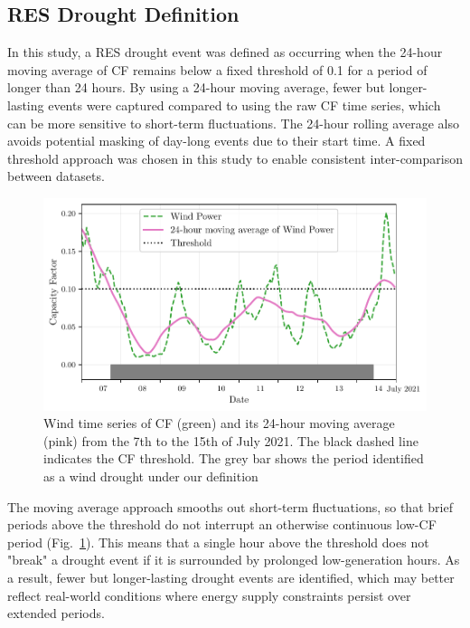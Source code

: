 \documentclass[preprint, 12pt]{elsarticle}
\begin{document}
\subsection{RES Drought Definition}
\label{sec:res_drought}

In this study, a RES drought event was defined as occurring when the 24-hour moving average of CF remains below a fixed threshold of 0.1 for a period of longer than 24 hours. By using a 24-hour moving average, fewer but longer-lasting events were captured compared to using the raw CF time series, which can be more sensitive to short-term fluctuations. The 24-hour rolling average also avoids potential masking of day-long events due to their start time. A fixed threshold approach was chosen in this study to enable consistent inter-comparison between datasets.

\begin{figure}[ht!]
	\centering
	\includegraphics[width=\textwidth]{droughts_methodology.pdf}
	\caption{Wind time series of CF (green) and its 24-hour moving average (pink) from the 7th to the 15th of July 2021. The black dashed line indicates the CF threshold. The grey bar shows the period identified as a wind drought under our definition}
	\label{fig:find_res_droughts}
\end{figure}

The moving average approach smooths out short-term fluctuations, so that brief periods above the threshold do not interrupt an otherwise continuous low-CF period (Fig.~\ref{fig:find_res_droughts}). This means that a single hour above the threshold does not "break" a drought event if it is surrounded by prolonged low-generation hours. As a result, fewer but longer-lasting drought events are identified, which may better reflect real-world conditions where energy supply constraints persist over extended periods.
\end{document}
